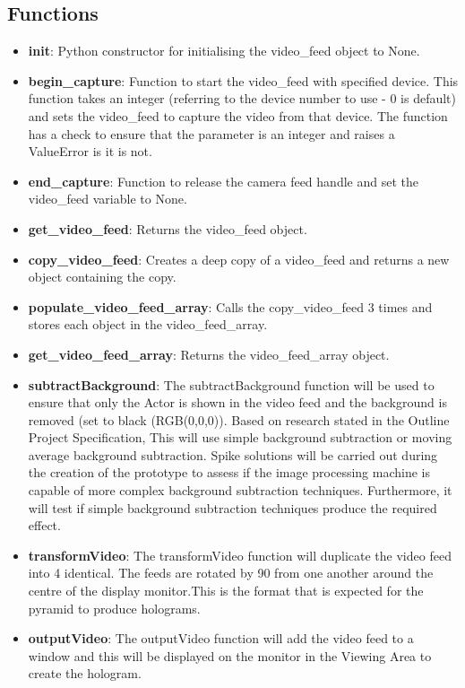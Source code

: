 \documentclass{article}
\begin{document}
\subsection{Functions}
\begin{itemize}
	\item \textbf{init}: Python constructor for initialising the video\_feed object to None.
	
	\item \textbf{begin\_capture}: Function to start the video\_feed with specified device. This function takes an integer (referring to the device number to use - 0 is default) and sets the video\_feed to capture the video from that device. The function has a check to ensure that the parameter is an integer and raises a ValueError is it is not.
	
	\item \textbf{end\_capture}: Function to release the camera feed handle and set the video\_feed variable to None.
	
	\item \textbf{get\_video\_feed}: Returns the video\_feed object.
	
	\item \textbf{copy\_video\_feed}: Creates a deep copy of a video\_feed and returns a new object containing the copy.
	
	\item \textbf{populate\_video\_feed\_array}: Calls the copy\_video\_feed 3 times and stores each object in the video\_feed\_array.
	
	\item \textbf{get\_video\_feed\_array}: Returns the video\_feed\_array object.

	\item \textbf{subtractBackground}: The subtractBackground function will be used to ensure that only the Actor is shown in the video feed and the background is removed (set to black (RGB(0,0,0)). Based on research stated in the Outline Project Specification, This will use simple background subtraction or moving average background subtraction. Spike solutions will be carried out during the creation of the prototype to assess if the image processing machine is capable of more complex background subtraction techniques. Furthermore, it will test if simple background subtraction techniques produce the required effect.

	\item \textbf{transformVideo}: The transformVideo function will duplicate the video feed into 4 identical. The feeds are rotated by 90 from one another around the centre of the display monitor.This is the format that is expected for the pyramid to produce holograms.

	\item \textbf{outputVideo}: The outputVideo function will add the video feed to a window and this will be displayed on the monitor in the Viewing Area to create the hologram.

\end{itemize}
\end{document}
